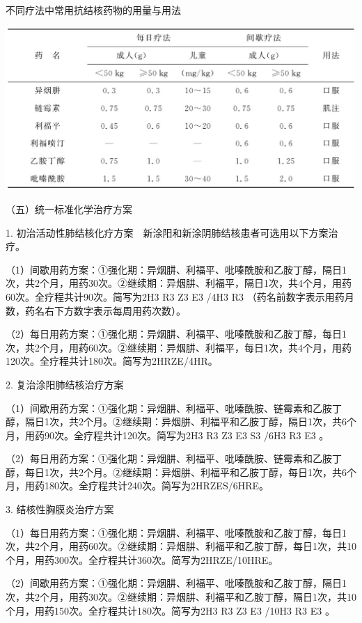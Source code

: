 \begin{table}[htbp]
\centering
\caption{不同疗法中常用抗结核药物的用量与用法}
\label{tab1-11-1}
\includegraphics{./images/Image00024.jpg}
\end{table}

{（五）统一标准化学治疗方案}

1.
初治活动性肺结核化疗方案　新涂阳和新涂阴肺结核患者可选用以下方案治疗。

（1）间歇用药方案：①强化期：异烟肼、利福平、吡嗪酰胺和乙胺丁醇，隔日1次，共2个月，用药30次。②继续期：异烟肼、利福平，隔日1次，共4个月，用药60次。全疗程共计90次。简写为2H{3}
R{3} Z{3} E{3} /4H{3} R{3}
（药名前数字表示用药月数，药名右下方数字表示每周用药次数）。

（2）每日用药方案：①强化期：异烟肼、利福平、吡嗪酰胺和乙胺丁醇，每日1次，共2个月，用药60次。②继续期：异烟肼、利福平，每日1次，共4个月，用药120次。全疗程共计180次。简写为2HRZE/4HR。

2. 复治涂阳肺结核治疗方案

（1）间歇用药方案：①强化期：异烟肼、利福平、吡嗪酰胺、链霉素和乙胺丁醇，隔日1次，共2个月。②继续期：异烟肼、利福平和乙胺丁醇，隔日1次，共6个月，用药90次。全疗程共计120次。简写为2H{3}
R{3} Z{3} E{3} S{3} /6H{3} R{3} E{3} 。

（2）每日用药方案：①强化期：异烟肼、利福平、吡嗪酰胺、链霉素和乙胺丁醇，每日1次，共2个月。②继续期：异烟肼、利福平和乙胺丁醇，每日1次，共6个月，用药180次。全疗程共计240次。简写为2HRZES/6HRE。

3. 结核性胸膜炎治疗方案

（1）每日用药方案：①强化期：异烟肼、利福平、吡嗪酰胺和乙胺丁醇，每日1次，共2个月，用药60次。②继续期：异烟肼、利福平和乙胺丁醇，每日1次，共10个月，用药300次。全疗程共计360次。简写为2HRZE/10HRE。

（2）间歇用药方案：①强化期：异烟肼、利福平、吡嗪酰胺和乙胺丁醇，隔日1次，共2个月，用药30次。②继续期：异烟肼、利福平和乙胺丁醇，隔日1次，共10个月，用药150次。全疗程共计180次。简写为2H{3}
R{3} Z{3} E{3} /10H{3} R{3} E{3} 。

